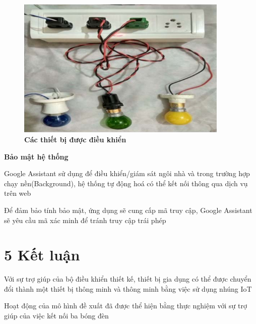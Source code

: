 \documentclass[11pt]{beamer}
\renewcommand{\label}[1]{%
			\gdef\sfname{sf:##1}}%
\begin{document}

\begin{frame}[c]{}
		
	\begin{figure}[h]
		\includegraphics[width=0.9\textwidth]{Image/Fig. 6 Items.png}
		\caption{\centering \textbf{Các thiết bị được điều khiển}}
	\end{figure}			
	
\end{frame}


\begin{frame}[c]{}
		
	\textbf{Bảo mật hệ thống}

	\vspace{2em}

	Google Assistant sử dụng để điều khiển/giám sát ngôi nhà và trong trường hợp chạy nền(Background), hệ thống tự động hoá có thể kết nối thông qua dịch vụ trên web

	\vspace{1em}

	Để đảm bảo tính bảo mật, ứng dụng sẽ cung cấp mã truy cập, Google Assistant sẽ yêu cầu mã xác minh để tránh truy cập trái phép
	
\end{frame}


\section{5 Kết luận}
\label{section5}


\begin{frame}[c]{}

	Với sự trợ giúp của bộ điều khiển thiết kế, thiết bị gia dụng có thể được chuyển đổi thành một thiết bị thông minh và thông minh bằng việc sử dụng nhúng IoT
	
	\vspace{2em}
	
	Hoạt động của mô hình đề xuất đã được thể hiện bằng thực nghiệm với sự trợ giúp của việc kết nối ba bóng đèn

\end{frame}
\end{document}
